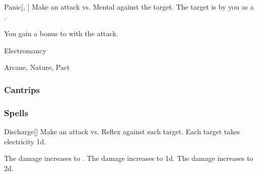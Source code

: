 \lowercase{\hypertarget{spell:Panic}{}}\label{spell:Panic}
\begin{freeability}[Rank 6]{\hypertarget{spell:Panic}{Panic}}[, ]
Make an attack vs. Mental against the target.
\hit The target is \panicked by you as a .

\rankline
{} You gain a  bonus to  with the attack.
\end{freeability}
\vspace{0.25em}


\newpage
\begin{spellsection}{Electromancy}

\begin{spellheader}
\end{spellheader}


 Arcane, Nature, Pact

\subsubsection{Cantrips}


\end{spellsection}


\subsubsection{Spells}


\lowercase{\hypertarget{spell:Discharge}{}}\label{spell:Discharge}
\begin{freeability}[Rank 1]{\hypertarget{spell:Discharge}{Discharge}}[]
Make an attack vs. Reflex against each target.
\hit Each target takes electricity  \minus1d.

\rankline
{} The damage increases to .
 The damage increases to  \plus1d.
 The damage increases to  \plus2d.
\end{freeability}
\vspace{0.25em}



